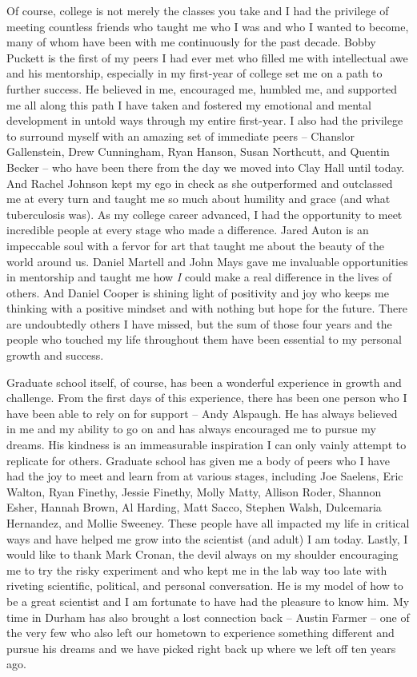 \documentclass[PhD]{dukethesis2006}
\begin{document}
\begin{doublespace}
Of course, college is not merely the classes you take and I had the privilege of meeting countless friends who taught me who I was and who I wanted to become, many of whom have been with me continuously for the past decade. Bobby Puckett is the first of my peers I had ever met who filled me with intellectual awe and his mentorship, especially in my first-year of college set me on a path to further success. He believed in me, encouraged me, humbled me, and supported me all along this path I have taken and fostered my emotional and mental development in untold ways through my entire first-year. I also had the privilege to surround myself with an amazing set of immediate peers -- Chanslor Gallenstein, Drew Cunningham, Ryan Hanson, Susan Northcutt, and Quentin Becker -- who have been there from the day we moved into Clay Hall until today. And Rachel Johnson kept my ego in check as she outperformed and outclassed me at every turn and taught me so much about humility and grace (and what tuberculosis was). As my college career advanced, I had the opportunity to meet incredible people at every stage who made a difference. Jared Auton is an impeccable soul with a fervor for art that taught me about the beauty of the world around us. Daniel Martell and John Mays gave me invaluable opportunities in mentorship and taught me how \textit{I} could make a real difference in the lives of others. And Daniel Cooper is shining light of positivity and joy who keeps me thinking with a positive mindset and with nothing but hope for the future. There are undoubtedly others I have missed, but the sum of those four years and the people who touched my life throughout them have been essential to my personal growth and success.

Graduate school itself, of course, has been a wonderful experience in growth and challenge. From the first days of this experience, there has been one person who I have been able to rely on for support -- Andy Alspaugh. He has always believed in me and my ability to go on and has always encouraged me to pursue my dreams. His kindness is an immeasurable inspiration I can only vainly attempt to replicate for others. Graduate school has given me a body of peers who I have had the joy to meet and learn from at various stages, including Joe Saelens, Eric Walton, Ryan Finethy, Jessie Finethy, Molly Matty, Allison Roder, Shannon Esher, Hannah Brown, Al Harding, Matt Sacco, Stephen Walsh, Dulcemaria Hernandez, and Mollie Sweeney. These people have all impacted my life in critical ways and have helped me grow into the scientist (and adult) I am today. Lastly, I would like to thank Mark Cronan, the devil always on my shoulder encouraging me to try the risky experiment and who kept me in the lab way too late with riveting scientific, political, and personal conversation. He is my model of how to be a great scientist and I am fortunate to have had the pleasure to know him. My time in Durham has also brought a lost connection back -- Austin Farmer -- one of the very few who also left our hometown to experience something different and pursue his dreams and we have picked right back up where we left off ten years ago. 


\end{doublespace}
\end{document}
